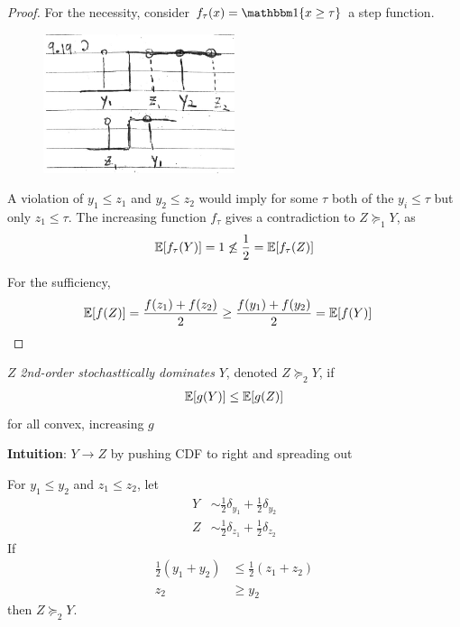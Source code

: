 \begin{proof}
  For the necessity, consider $f_\tau(x) = \ind\{x \geq \tau\}$ a step function.
  \begin{figure}[H]
    \begin{center}
      \includegraphics[width=0.5\textwidth]{figures/9-19-2.png}
    \end{center}
  \end{figure}
  A violation of $y_1 \leq z_1$ and $y_2 \leq z_2$ would imply for some $\tau$ both
  of the $y_i \leq \tau$ but only $z_1 \leq \tau$. The increasing function $f_\tau$
  gives a contradiction to $Z \succeq_1 Y$, as
  \begin{align}
    \mathbb{E}[f_\tau(Y)] = 1 \not\leq \frac{1}{2} = \mathbb{E}[f_\tau(Z)]
  \end{align}

  For the sufficiency,
  \begin{align}
    \mathbb{E}[f(Z)]
    &= \frac{f(z_1) + f(z_2)}{2}
    \geq \frac{f(y_1) + f(y_2)}{2}
    = \mathbb{E}[f(Y)]
  \end{align}
\end{proof}

\begin{definition}
  $Z$ \emph{2nd-order stochasttically dominates} $Y$, denoted $Z \succeq_2 Y$, if
  \begin{align}
    \mathbb{E}[g(Y)] \leq \mathbb{E}[g(Z)]
  \end{align}
  for all convex, increasing $g$

  \textbf{Intuition}: $Y \to Z$ by pushing CDF to right and spreading out
\end{definition}

\begin{lemma}\label{lem:two-point-2o-sd}
  For $y_1 \leq y_2$ and $z_1 \leq z_2$, let
  \begin{align}
    Y &\sim \frac{1}{2} \delta_{y_1} + \frac{1}{2} \delta_{y_2} \\
    Z &\sim \frac{1}{2} \delta_{z_1} + \frac{1}{2} \delta_{z_2}
  \end{align}
  If
  \begin{align}
    \frac{1}{2}(y_1 + y_2) &\leq \frac{1}{2}(z_1 + z_2) \\
    z_2 &\geq y_2
  \end{align}
  then $Z \succeq_2 Y$.
\end{lemma}

